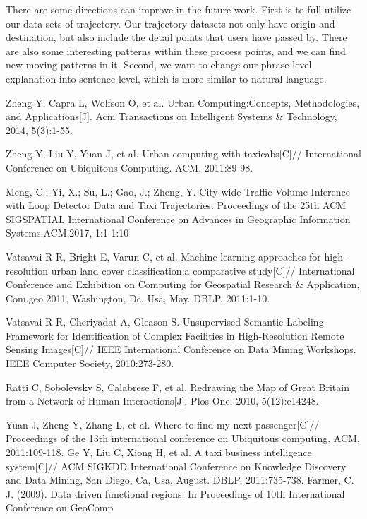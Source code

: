 \documentclass[runningheads]{llncs}
\begin{document}
There are some directions can improve in the future work.
First is to full utilize our data sets of trajectory. 
Our trajectory datasets not only have origin and destination, but also include the detail points that users have passed by.
There are also some interesting patterns within these process points, and we can find new moving patterns in it. 
Second, we want to change our phrase-level explanation into sentence-level, which is more similar to natural language.



\begin{thebibliography}{25}
Zheng Y, Capra L, Wolfson O, et al. Urban Computing:Concepts, Methodologies, and Applications[J]. Acm Transactions on Intelligent Systems \& Technology, 2014, 5(3):1-55.
  
Zheng Y, Liu Y, Yuan J, et al. Urban computing with taxicabs[C]// International Conference on Ubiquitous Computing. ACM, 2011:89-98.
   
Meng, C.; Yi, X.; Su, L.; Gao, J.; Zheng, Y. City-wide Traffic Volume Inference with Loop Detector Data and Taxi Trajectories. Proceedings of the 25th ACM SIGSPATIAL International Conference on Advances in Geographic Information Systems,ACM,2017, 1:1-1:10


Vatsavai R R, Bright E, Varun C, et al. Machine learning approaches for high-resolution urban land cover classification:a comparative study[C]// International Conference and Exhibition on Computing for Geospatial Research \& Application, Com.geo 2011, Washington, Dc, Usa, May. DBLP, 2011:1-10.

Vatsavai R R, Cheriyadat A, Gleason S. Unsupervised Semantic Labeling Framework for Identification of Complex Facilities in High-Resolution Remote Sensing Images[C]// IEEE International Conference on Data Mining Workshops. IEEE Computer Society, 2010:273-280.
 

Ratti C, Sobolevsky S, Calabrese F, et al. Redrawing the Map of Great Britain from a Network of Human Interactions[J]. Plos One, 2010, 5(12):e14248.

Yuan J, Zheng Y, Zhang L, et al. Where to find my next passenger[C]// Proceedings of the 13th international conference on Ubiquitous computing. ACM, 2011:109-118.
Ge Y, Liu C, Xiong H, et al. A taxi business intelligence system[C]// ACM SIGKDD International Conference on Knowledge Discovery and Data Mining, San Diego, Ca, Usa, August. DBLP, 2011:735-738.
Farmer, C. J. (2009). Data driven functional regions. In Proceedings of 10th International Conference on GeoComp
 

\end{thebibliography}
\end{document}
